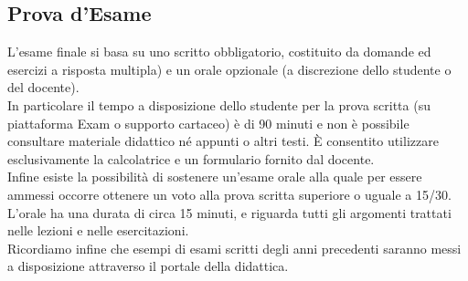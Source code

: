 \documentclass[../main.tex]{subfiles}
\begin{document}
\subsection{Prova d'Esame}

L’esame finale si basa su uno scritto obbligatorio, costituito da domande ed esercizi a risposta multipla) e un orale opzionale (a discrezione dello studente o del docente).\\
In particolare il tempo a disposizione dello studente per la prova scritta (su
piattaforma Exam o supporto cartaceo) è di 90 minuti e non è possibile consultare materiale didattico né appunti o altri testi. È consentito utilizzare esclusivamente la calcolatrice e un formulario fornito dal docente.\\
Infine esiste la possibilità di sostenere un'esame orale alla quale per essere ammessi occorre ottenere un voto alla prova scritta superiore o uguale a 15/30. L'orale ha una durata di circa 15 minuti, e riguarda tutti gli argomenti trattati nelle lezioni e nelle esercitazioni.\\

Ricordiamo infine che esempi di esami scritti degli anni precedenti saranno messi a disposizione attraverso il portale della didattica.
\end{document}
